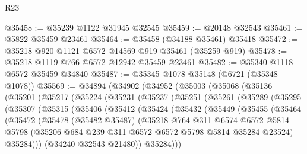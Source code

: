 \begin{lexlean}{R23}
\begin{coremodule}
@35458 := @35239 @1122 @31945 @32545
@35459 := @20148 @32543
@35461 := @5822 @35459 @23461
@35464 := @35458 (@34188 @35461) @35418
@35472 := @35218 @920 @1121 @6572 @14569 @919 @35461 (@35259 @919)
@35478 := @35218 @1119 @766 @6572 @12942 @35459 @23461
@35482 := @35340 @1118 @6572 @35459 @34840
@35487 := @35345 @1078 @35148 (@6721 (@35348 @1078))
@35569 := @34894
    (@34902
      (@34952
        (@35003
          (@35068
            (@35136
              (@35201
                (@35217
                  (@35224
                    (@35231
                      (@35237
                        (@35251
                          (@35261
                            (@35289
                              (@35295
                                (@35307
                                  (@35315
                                    (@35406
                                      (@35412
                                        (@35424
                                          (@35432
                                            (@35449
                                              (@35455
                                                (@35464
                                                  (@35472
                                                    (@35478
                                                      (@35482 @35487)
                                                      (@35218
                                                        @764
                                                        @311
                                                        @6574
                                                        @6572
                                                        @5814
                                                        @5798
                                                        (@35206
                                                          @684
                                                          @239
                                                          @311
                                                          @6572
                                                          @6572
                                                          @5798
                                                          @5814
                                                          @35284
                                                          @23524)
                                                        @35284)))
                                                  (@34240 @32543 @21480))
                                                @35284)))

\end{coremodule}
\end{lexlean}
